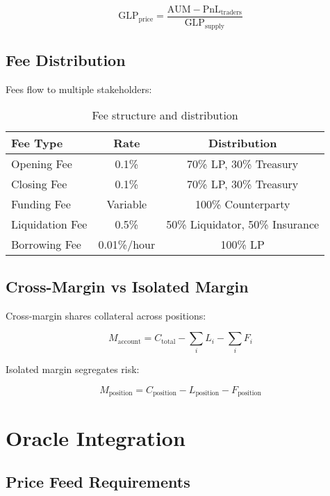 \documentclass[11pt,a4paper]{article}
\begin{document}
\begin{equation}
\text{GLP}_{\text{price}} = \frac{\text{AUM} - \text{PnL}_{\text{traders}}}{\text{GLP}_{\text{supply}}}
\end{equation}

\subsection{Fee Distribution}

Fees flow to multiple stakeholders:

\begin{table}[h]
\centering
\begin{tabular}{|l|c|c|}
\hline
\textbf{Fee Type} & \textbf{Rate} & \textbf{Distribution} \\
\hline
Opening Fee & 0.1\% & 70\% LP, 30\% Treasury \\
Closing Fee & 0.1\% & 70\% LP, 30\% Treasury \\
Funding Fee & Variable & 100\% Counterparty \\
Liquidation Fee & 0.5\% & 50\% Liquidator, 50\% Insurance \\
Borrowing Fee & 0.01\%/hour & 100\% LP \\
\hline
\end{tabular}
\caption{Fee structure and distribution}
\end{table}

\subsection{Cross-Margin vs Isolated Margin}

Cross-margin shares collateral across positions:

\begin{equation}
M_{\text{account}} = C_{\text{total}} - \sum_{i} L_i - \sum_{i} F_i
\end{equation}

Isolated margin segregates risk:

\begin{equation}
M_{\text{position}} = C_{\text{position}} - L_{\text{position}} - F_{\text{position}}
\end{equation}

\section{Oracle Integration}

\subsection{Price Feed Requirements}
\end{document}
